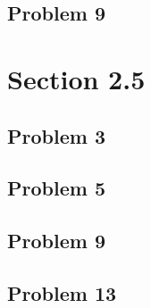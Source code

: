 \documentclass[12pt]{article}
\begin{document}
\subsection*{Problem 9}
\label{sec:org2bffd57}
\section*{Section 2.5}
\label{sec:org3a63f7c}
\subsection*{Problem 3}
\label{sec:orga7dfd3f}
\subsection*{Problem 5}
\label{sec:orgb319bbc}
\subsection*{Problem 9}
\label{sec:org6625e4b}
\subsection*{Problem 13}
\label{sec:org7403f04}
\end{document}
